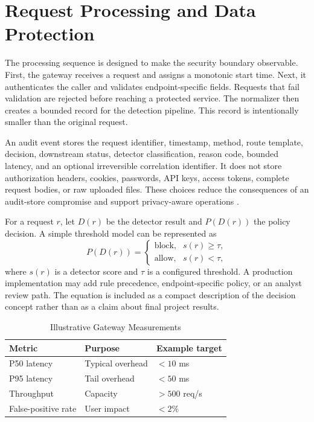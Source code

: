 \documentclass[conference]{IEEEtran}
\begin{document}
\section{Request Processing and Data Protection}
The processing sequence is designed to make the security boundary observable.
First, the gateway receives a request and assigns a monotonic start time. Next,
it authenticates the caller and validates endpoint-specific fields. Requests
that fail validation are rejected before reaching a protected service. The
normalizer then creates a bounded record for the detection pipeline. This
record is intentionally smaller than the original request.

An audit event stores the request identifier, timestamp, method, route
template, decision, downstream status, detector classification, reason code,
bounded latency, and an optional irreversible correlation identifier. It does
not store authorization headers, cookies, passwords, API keys, access tokens,
complete request bodies, or raw uploaded files. These choices reduce the
consequences of an audit-store compromise and support privacy-aware operations
\cite{nistprivacy}.

For a request $r$, let $D(r)$ be the detector result and $P(D(r))$ the policy
decision. A simple threshold model can be represented as
\begin{equation}
  P(D(r)) =
  \begin{cases}
    \text{block}, & s(r) \geq \tau,\\
    \text{allow}, & s(r) < \tau,
  \end{cases}
  \label{eq:threshold}
\end{equation}
where $s(r)$ is a detector score and $\tau$ is a configured threshold. A
production implementation may add rule precedence, endpoint-specific policy,
or an analyst review path. The equation is included as a compact description
of the decision concept rather than as a claim about final project results.

\begin{table}[!t]
\caption{Illustrative Gateway Measurements}
\label{tab:metrics}
\centering
\begin{tabular}{@{}lll@{}}
\toprule
Metric & Purpose & Example target \\
\midrule
P50 latency & Typical overhead & $<10$ ms \\
P95 latency & Tail overhead & $<50$ ms \\
Throughput & Capacity & $>500$ req/s \\
False-positive rate & User impact & $<2\%$ \\
\bottomrule
\end{tabular}
\end{table}
\end{document}
